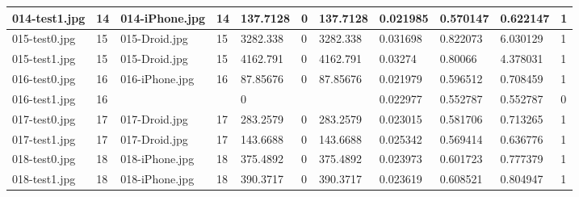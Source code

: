 \begin{landscape}
\begin{longtable}{|p{2cm}|p{1cm}|p{2cm}|p{1cm}|p{2cm}|p{1cm}|p{2cm}|p{2cm}|p{2cm}|p{2cm}|p{1cm}|}
		014-test1.jpg   & 14               & 014-iPhone.jpg        & 14                          & 137.7128              & 0                       & 137.7128                   & 0.021985              & 0.570147              & 0.622147                 & 1                \\ \hline
		015-test0.jpg   & 15               & 015-Droid.jpg         & 15                          & 3282.338              & 0                       & 3282.338                   & 0.031698              & 0.822073              & 6.030129                 & 1                \\ \hline
		015-test1.jpg   & 15               & 015-Droid.jpg         & 15                          & 4162.791              & 0                       & 4162.791                   & 0.03274               & 0.80066               & 4.378031                 & 1                \\ \hline
		016-test0.jpg   & 16               & 016-iPhone.jpg        & 16                          & 87.85676              & 0                       & 87.85676                   & 0.021979              & 0.596512              & 0.708459                 & 1                \\ \hline
		016-test1.jpg   & 16               &                       &                             & 0                     &                         &                            & 0.022977              & 0.552787              & 0.552787                 & 0                \\ \hline
		017-test0.jpg   & 17               & 017-Droid.jpg         & 17                          & 283.2579              & 0                       & 283.2579                   & 0.023015              & 0.581706              & 0.713265                 & 1                \\ \hline
		017-test1.jpg   & 17               & 017-Droid.jpg         & 17                          & 143.6688              & 0                       & 143.6688                   & 0.025342              & 0.569414              & 0.636776                 & 1                \\ \hline
		018-test0.jpg   & 18               & 018-iPhone.jpg        & 18                          & 375.4892              & 0                       & 375.4892                   & 0.023973              & 0.601723              & 0.777379                 & 1                \\ \hline
		018-test1.jpg   & 18               & 018-iPhone.jpg        & 18                          & 390.3717              & 0                       & 390.3717                   & 0.023619              & 0.608521              & 0.804947                 & 1                \\ \hline

\end{longtable}
\end{landscape}
